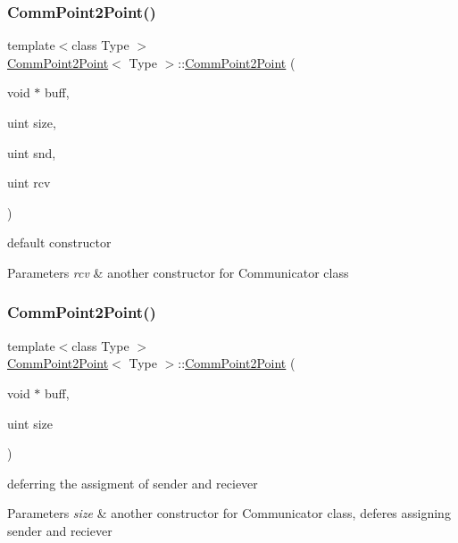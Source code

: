 \subsubsection{\texorpdfstring{Comm\+Point2\+Point()}{CommPoint2Point()}\hspace{0.1cm}{\footnotesize\ttfamily [2/3]}}
{\footnotesize\ttfamily template$<$class Type $>$ \\
\mbox{\hyperlink{classCommPoint2Point}{Comm\+Point2\+Point}}$<$ Type $>$\+::\mbox{\hyperlink{classCommPoint2Point}{Comm\+Point2\+Point}} (\begin{DoxyParamCaption}\item[{void $\ast$}]{buff,  }\item[{uint}]{size,  }\item[{uint}]{snd,  }\item[{uint}]{rcv }\end{DoxyParamCaption})}

default constructor 
\begin{DoxyParams}{Parameters}
{\em rcv} & another constructor for Communicator class \\
\hline
\end{DoxyParams}
\mbox{\label{classCommPoint2Point_a7e60b9a67fcae40edaa4410425fac6ab}} 
\subsubsection{\texorpdfstring{Comm\+Point2\+Point()}{CommPoint2Point()}\hspace{0.1cm}{\footnotesize\ttfamily [3/3]}}
{\footnotesize\ttfamily template$<$class Type $>$ \\
\mbox{\hyperlink{classCommPoint2Point}{Comm\+Point2\+Point}}$<$ Type $>$\+::\mbox{\hyperlink{classCommPoint2Point}{Comm\+Point2\+Point}} (\begin{DoxyParamCaption}\item[{void $\ast$}]{buff,  }\item[{uint}]{size }\end{DoxyParamCaption})}

deferring the assigment of sender and reciever 
\begin{DoxyParams}{Parameters}
{\em size} & another constructor for Communicator class, deferes assigning sender and reciever \\
\hline
\end{DoxyParams}


